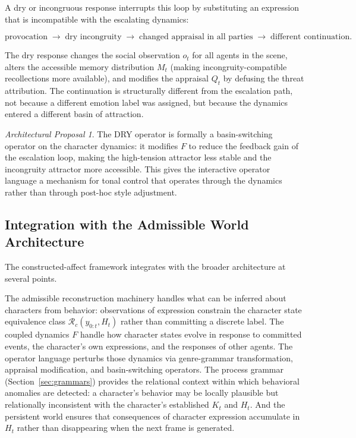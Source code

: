 \documentclass[11pt,a4paper]{article}
\theoremstyle{plain}
\theoremstyle{definition}
\theoremstyle{remark}
\newtheorem{proposal}[theorem]{Architectural Proposal}
\begin{document}
A dry or incongruous response interrupts this loop by substituting an expression that is incompatible with the escalating dynamics:

\[
\text{provocation} \;\to\; \text{dry incongruity} \;\to\; \text{changed appraisal in all parties} \;\to\; \text{different continuation}.
\]

The dry response changes the social observation $o_t$ for all agents in the scene, alters the accessible memory distribution $M_t$ (making incongruity-compatible recollections more available), and modifies the appraisal $Q_t$ by defusing the threat attribution. The continuation is structurally different from the escalation path, not because a different emotion label was assigned, but because the dynamics entered a different basin of attraction.

\begin{proposal}
The \textsc{DRY} operator is formally a basin-switching operator on the character dynamics: it modifies $F$ to reduce the feedback gain of the escalation loop, making the high-tension attractor less stable and the incongruity attractor more accessible. This gives the interactive operator language a mechanism for tonal control that operates through the dynamics rather than through post-hoc style adjustment.
\end{proposal}

\subsection{Integration with the Admissible World Architecture}

The constructed-affect framework integrates with the broader architecture at several points.

The admissible reconstruction machinery handles what can be inferred about characters from behavior: observations of expression constrain the character state equivalence class $\mathcal{R}_c(y_{0:t}, H_t)$ rather than committing a discrete label. The coupled dynamics $F$ handle how character states evolve in response to committed events, the character's own expressions, and the responses of other agents. The operator language perturbs those dynamics via genre-grammar transformation, appraisal modification, and basin-switching operators. The process grammar (Section~\ref{sec:grammars}) provides the relational context within which behavioral anomalies are detected: a character's behavior may be locally plausible but relationally inconsistent with the character's established $K_t$ and $H_t$. And the persistent world ensures that consequences of character expression accumulate in $H_t$ rather than disappearing when the next frame is generated.
\end{document}
